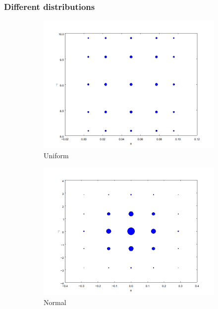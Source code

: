 \documentclass{beamer}
\begin{document}
 
  \begin{frame}
 \frametitle{Different distributions}
 \begin{figure}        
 \begin{subfigure}[b]{0.37\textwidth}
                \includegraphics[width=\textwidth]{nodes_uniform.png}
                \caption{Uniform}
        \end{subfigure}%
 \begin{subfigure}[b]{0.37\textwidth}
                \includegraphics[width=\textwidth]{nodes_normal.png}
                \caption{Normal}
        \end{subfigure}
 \begin{subfigure}[b]{0.37\textwidth}

\end{subfigure}
\end{figure}
\end{frame}
\end{document}
